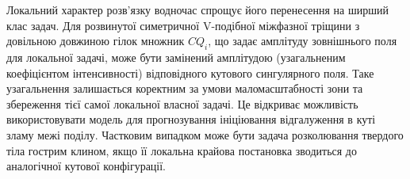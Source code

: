 Локальний характер розв'язку водночас спрощує його перенесення на
ширший клас задач. Для розвинутої симетричної V-подібної міжфазної
тріщини з довільною довжиною гілок множник $CQ_i$, що задає амплітуду
зовнішнього поля для локальної задачі, може бути замінений амплітудою
(узагальненим коефіцієнтом інтенсивності) відповідного кутового
сингулярного поля. Таке узагальнення залишається коректним за умови
маломасштабності зони та збереження тієї самої локальної власної задачі.
Це відкриває можливість використовувати модель для прогнозування
ініціювання відгалуження в куті зламу межі поділу. Частковим випадком
може бути задача розколювання твердого тіла гострим клином, якщо її
локальна крайова постановка зводиться до аналогічної кутової
конфігурації.
